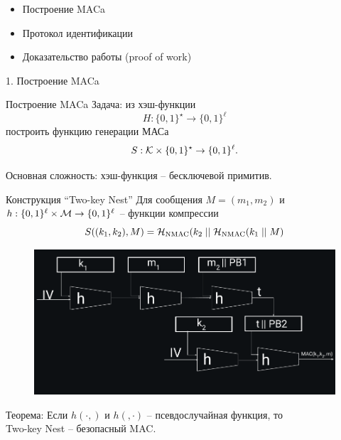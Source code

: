 \documentclass[usenames,dvipsnames,8pt,aspectratio=169]{beamer}
\begin{document}
\begin{frame}
\Large
\begin{itemize}
	\itemsep 10pt
	\item Построение MACa
	\item Протокол идентификации
	\item Доказательство работы (proof of work)
\end{itemize}
\end{frame}

\begin{frame}

\begin{LARGE}


\color{Orange}
1. Построение MACa

\end{LARGE}
\end{frame}

\begin{frame}{Построение MACa}
\Large
{\color{Orange} Задача:} из хэш-функции 
\[H: \{0,1\}^\star \rightarrow \{0,1\}^{\ell}\] построить функцию генерации МАСа 
\[S: \mathcal{K} \times \{0,1\}^\star \rightarrow \{0,1\}^{\ell}.\]

\vspace{20pt}

Основная сложность: хэш-функция -- бесключевой примитив. 

\end{frame}

\begin{frame}{Конструкция ``Two-key Nest''}
\Large
Для сообщения $M = (m_1, m_2)$ и $h: \{0,1\}^\ell \times \mathcal{M} \rightarrow  \{0,1\}^\ell $ -- функции компрессии
\[
S((k_1, k_2), M) = \mathcal{H}_{\text{NMAC}}(k_2 \; ||  \; \mathcal{H}_{\text{NMAC}}(k_1 \; || \; M)
\]

\begin{figure}
\hspace{-60pt}
\includegraphics[scale=0.35]{TwoKeyNest}
\end{figure}
\vspace{-30pt}
{\color{Orange} Теорема:} Если $h(\cdot, )$ и $h(, \cdot)$ -- псевдослучайная функция, то \\ Two-key Nest -- безопасный MAC.

\end{frame}
\end{document}
